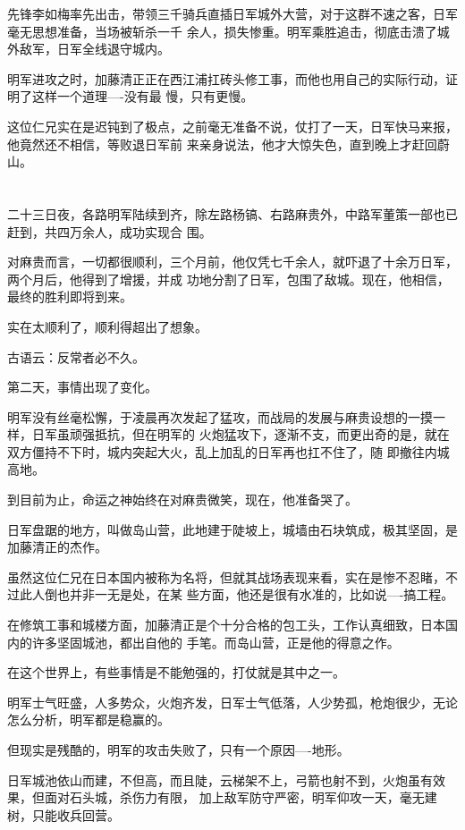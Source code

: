 \documentclass[11pt,a4paper,onecolumn]{article}
\begin{document}
先锋李如梅率先出击，带领三千骑兵直插日军城外大营，对于这群不速之客，日军毫无思想准备，当场被斩杀一千
余人，损失惨重。明军乘胜追击，彻底击溃了城外敌军，日军全线退守城内。

明军进攻之时，加藤清正正在西江浦扛砖头修工事，而他也用自己的实际行动，证明了这样一个道理----没有最
慢，只有更慢。

这位仁兄实在是迟钝到了极点，之前毫无准备不说，仗打了一天，日军快马来报，他竟然还不相信，等败退日军前
来亲身说法，他才大惊失色，直到晚上才赶回蔚山。

\section[\thesection]{}

二十三日夜，各路明军陆续到齐，除左路杨镐、右路麻贵外，中路军董策一部也已赶到，共四万余人，成功实现合
围。

对麻贵而言，一切都很顺利，三个月前，他仅凭七千余人，就吓退了十余万日军，两个月后，他得到了增援，并成
功地分割了日军，包围了敌城。现在，他相信，最终的胜利即将到来。

实在太顺利了，顺利得超出了想象。

古语云：反常者必不久。

第二天，事情出现了变化。

明军没有丝毫松懈，于凌晨再次发起了猛攻，而战局的发展与麻贵设想的一摸一样，日军虽顽强抵抗，但在明军的
火炮猛攻下，逐渐不支，而更出奇的是，就在双方僵持不下时，城内突起大火，乱上加乱的日军再也扛不住了，随
即撤往内城高地。

到目前为止，命运之神始终在对麻贵微笑，现在，他准备哭了。

日军盘踞的地方，叫做岛山营，此地建于陡坡上，城墙由石块筑成，极其坚固，是加藤清正的杰作。

虽然这位仁兄在日本国内被称为名将，但就其战场表现来看，实在是惨不忍睹，不过此人倒也并非一无是处，在某
些方面，他还是很有水准的，比如说----搞工程。

在修筑工事和城楼方面，加藤清正是个十分合格的包工头，工作认真细致，日本国内的许多坚固城池，都出自他的
手笔。而岛山营，正是他的得意之作。

在这个世界上，有些事情是不能勉强的，打仗就是其中之一。

明军士气旺盛，人多势众，火炮齐发，日军士气低落，人少势孤，枪炮很少，无论怎么分析，明军都是稳赢的。

但现实是残酷的，明军的攻击失败了，只有一个原因----地形。

日军城池依山而建，不但高，而且陡，云梯架不上，弓箭也射不到，火炮虽有效果，但面对石头城，杀伤力有限，
加上敌军防守严密，明军仰攻一天，毫无建树，只能收兵回营。
\end{document}
